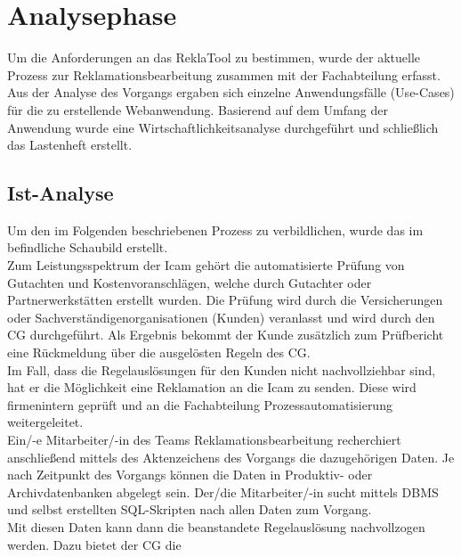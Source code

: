 \section{Analysephase} 
\label{sec:Analysephase}
Um die Anforderungen an das ReklaTool zu bestimmen, wurde der aktuelle Prozess zur Reklamationsbearbeitung
zusammen mit der Fachabteilung erfasst. Aus der Analyse des Vorgangs ergaben sich
einzelne Anwendungsfälle (Use-Cases) für die zu erstellende Webanwendung.
Basierend auf dem Umfang der Anwendung wurde eine Wirtschaftlichkeitsanalyse durchgeführt und
schließlich das Lastenheft erstellt.

\subsection{Ist-Analyse} 
\label{sec:IstAnalyse}
Um den im Folgenden beschriebenen Prozess zu verbildlichen, wurde das im  befindliche 
Schaubild erstellt.\\
Zum Leistungsspektrum der \acs{Icam} gehört die automatisierte Prüfung von Gutachten und
Kostenvoranschlägen, welche durch Gutachter oder Partnerwerkstätten erstellt wurden.
Die Prüfung wird durch die Versicherungen oder Sachverständigenorganisationen (Kunden) veranlasst
und wird durch den \acs{CG} durchgeführt.
Als Ergebnis bekommt der Kunde zusätzlich zum Prüfbericht eine Rückmeldung über die ausgelösten Regeln des \acs{CG}.\\
Im Fall, dass die Regelauslösungen für den Kunden nicht nachvollziehbar sind, hat er die
Möglichkeit eine Reklamation an die \acs{Icam} zu senden. Diese wird firmenintern geprüft
und an die Fachabteilung Prozessautomatisierung weitergeleitet.\\
Ein/-e Mitarbeiter/-in des Teams Reklamationsbearbeitung recherchiert anschließend mittels des Aktenzeichens
des Vorgangs die dazugehörigen Daten. Je nach Zeitpunkt des Vorgangs können die Daten in Produktiv- oder Archivdatenbanken 
abgelegt sein. Der/die Mitarbeiter/-in sucht mittels \ac{DBMS} und selbst 
erstellten SQL-Skripten nach allen Daten zum Vorgang.\\
Mit diesen Daten kann dann die beanstandete Regelauslösung nachvollzogen werden. Dazu bietet der \acs{CG} die 
